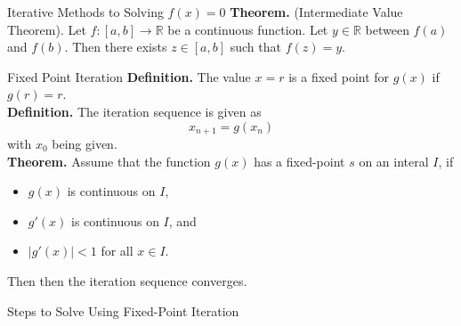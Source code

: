 \documentclass{article}
\begin{document}
\begin{multicols*}{3}
    \begin{blackbox}{Iterative Methods to Solving $f(x) = 0$}
        \textbf{Theorem.} (Intermediate Value Theorem). Let $f: [a,b] \rightarrow \mathbb{R}$ be a continuous function. Let $y \in \mathbb{R}$ between $f(a)$ and $f(b)$. Then there exists $z \in [a,b]$ such that $f(z) = y$.
        \begin{bluebox}{Fixed Point Iteration}
            \textbf{Definition.} The value $x = r$ is a fixed point for $g(x)$ if $g(r) = r$.\\
            \textbf{Definition.} The iteration sequence is given as \\[-2ex]
            \[x_{n+1} = g(x_n)\]
            with $x_0$ being given. \\[1ex]
            \textbf{Theorem.} Assume that the function $g(x)$ has a fixed-point $s$ on an interal $I$, if 
            \begin{itemize}
                \item $g(x)$ is continuous on $I$,
                \item $g'(x)$ is continuous on $I$, and
                \item $|g'(x)| < 1$ for all $x \in I$.
            \end{itemize}
            Then then the iteration sequence converges.
            \begin{redbox}{Steps to Solve Using Fixed-Point Iteration}
               

\end{redbox}
\end{bluebox}
\end{blackbox}
\end{multicols*}
\end{document}
